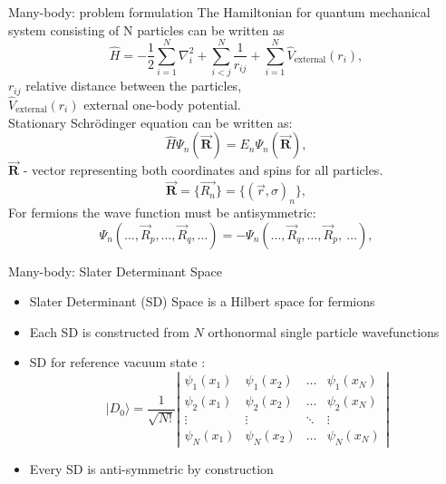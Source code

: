 \documentclass{beamer}
\begin{document}
\begin{frame}{Many-body: problem formulation}
The Hamiltonian for quantum mechanical system consisting of N particles  can be written as
\begin{equation*}
\hat{H} = -\frac{1}{2}\sum_{i=1}^{N} \nabla_i^2 + \sum_{i<j}^{N}\frac{1}{r_{ij}} + \sum_{i=1}^{N} \hat{V}_{\text{external}}(r_i),
\end{equation*}
$r_{ij}$  relative distance between the particles, \\
$\hat{V}_{\text{external}}(r_i)$ external one-body potential.\\

Stationary Schr\"{o}dinger equation can be written as:
\begin{equation*}
\hat{H}\Psi_n(\vec{\textbf{R}}) = E_n\Psi_n(\vec{\textbf{R}}),
\end{equation*}
$\vec{\textbf{R}}$ - vector representing both coordinates and spins for all particles.
\begin{equation*}
\vec{\textbf{R}} = \{\vec{R_n}\}= \{(\vec{r}, \sigma)_n\},
\end{equation*}
For fermions the wave function must be antisymmetric:
\begin{equation*}
\Psi_n({\dots, \vec{R}_p , \dots, \vec{R}_q, \dots}) = -\Psi_n({\dots, \vec{R}_q , \dots, \vec{R}_p, \ \dots}),
\end{equation*}
\end{frame}

\begin{frame}{Many-body: Slater Determinant Space}
\begin{itemize}
  	\item Slater Determinant (SD) Space is a Hilbert space for fermions 
  	\item Each SD is constructed from $N$ orthonormal single particle
  	wavefunctions
  	\item SD for reference vacuum state :
  \begin{equation*}
  |D_0\rangle = \frac{1}{\sqrt{N!}}
  \left| \begin{array}{ccccc} \psi_{1}(x_1)& \psi_{1}(x_2)& \dots & \psi_{1}(x_N)\\
  \psi_{2}(x_1)&\psi_{2}(x_2)& \dots  & \psi_{2}(x_N)\\  
  \vdots & \vdots & \ddots  & \vdots \\
  \psi_{N}(x_1)&\psi_{N}(x_2)& \dots  & \psi_{N}(x_N)\end{array} \right| 
  \end{equation*}
  \item Every  SD is anti-symmetric by construction
   \end{itemize}
  \end{frame}
\end{document}
